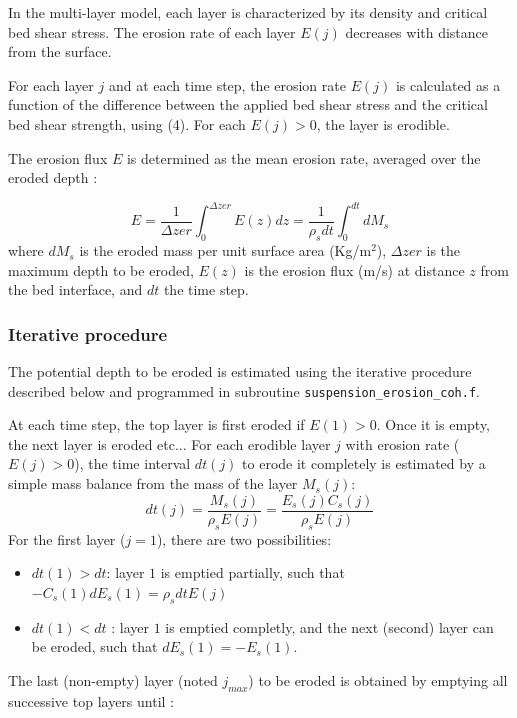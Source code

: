 In the multi-layer model, each layer is characterized by its density and
critical bed shear stress. The erosion rate of each layer $E(j)$ decreases with distance from the surface.

For each layer $j$ and at each time step, the erosion rate $E(j)$ is calculated
as a function of the difference between the applied bed shear stress and the
critical bed shear strength, using (4). For each $E(j) > 0$, the layer
is erodible.

The erosion flux $E$ is determined as the mean erosion rate, averaged
over the eroded depth :

\begin{equation*}
E = \frac{1}{\Delta zer} \int_0^{\Delta zer} E(z) dz = \frac{1}{\rho_s dt}
\int_0^{dt} dM_s 
\end{equation*}
where $dM_s$ is the eroded mass per unit surface
area (Kg/m$^2$), $\Delta zer$ is the maximum depth to be eroded, 
$E(z)$ is the erosion flux (m/s) at distance $z$ from
the bed interface, and $dt$ the time step.

\subsubsection*{Iterative procedure}
The potential depth to be eroded is estimated using the iterative procedure
described below and programmed in subroutine \texttt{suspension\_erosion\_coh.f}.

At each time step, the top layer is first eroded if $E(1) > 0$. Once it
is empty, the next layer is eroded etc... For each erodible layer $j$ with
erosion rate ($E(j) > 0$), the time interval $dt(j)$ to erode it
completely is estimated by a simple mass balance from the mass of the layer
$M_s(j)$:
\begin{equation*}
dt(j)=\frac{M_s(j)}{\rho_s E(j)} =\frac{E_s(j) C_s(j)}{\rho_s E(j)} 
\end{equation*}
For the first layer ($j=1$), there are two possibilities: 
\begin{itemize}
\item $dt(1) > dt$: layer $1$ is emptied partially, such that $-C_s(1) dE_s(1)=\rho_s dt E(j)$ 
\item $dt(1) < dt$ : layer $1$ is emptied completly, and the next (second) layer can be eroded, such that $dE_s(1)=-E_s(1)$. 
\end{itemize}
The last (non-empty) layer (noted $j_{max}$) to be eroded is obtained by
emptying all successive top layers until :

